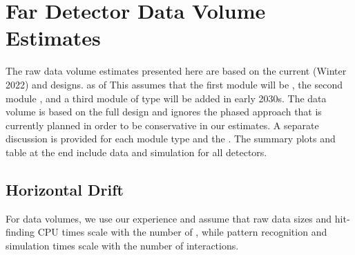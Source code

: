 \documentclass[../main-v1.tex]{subfiles}
\begin{document}






\section{Far Detector Data Volume Estimates }%
\label{sec:est:FD}  

The raw data volume estimates presented here are based on the %
current (Winter 2022) 
  and  designs. as of %
This assumes that the first module will be , the second module , and a third module of type  will be added in early 2030s. The  data volume is based on the full  design and ignores the phased approach that is currently planned in order to be conservative in our estimates. A separate discussion is provided for each  module type and the . The summary plots and table at the end include data and simulation for all detectors.

\subsection{Horizontal Drift}
For   data volumes, we use our  experience and assume that raw data sizes and hit-finding CPU times scale with the number of , while pattern recognition and simulation times scale with the number of interactions. 
\end{document}
